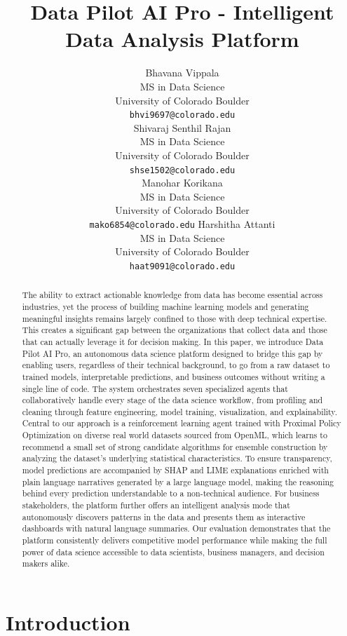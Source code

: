 \documentclass{article}
\title{Data Pilot AI Pro - Intelligent Data Analysis Platform}
\author{%
  Bhavana Vippala \\
  MS in Data Science\\
  University of Colorado Boulder\\
  \texttt{bhvi9697@colorado.edu} \\
  \And
  Shivaraj Senthil Rajan \\
  MS in Data Science\\
  University of Colorado Boulder\\
  \texttt{shse1502@colorado.edu} \\
  \And
  Manohar Korikana \\
  MS in Data Science\\
  University of Colorado Boulder\\
  \texttt{mako6854@colorado.edu}
  \And
  Harshitha Attanti \\
  MS in Data Science\\
  University of Colorado Boulder\\
  \texttt{haat9091@colorado.edu}
}
\begin{document}
\maketitle

\thispagestyle{plain}
\pagestyle{plain}

\begin{abstract}
The ability to extract actionable knowledge from data has become essential across industries, yet the process of building machine learning models and generating meaningful insights remains largely confined to those with deep technical expertise. This creates a significant gap between the organizations that collect data and those that can actually leverage it for decision making. In this paper, we introduce Data Pilot AI Pro, an autonomous data science platform designed to bridge this gap by enabling users, regardless of their technical background, to go from a raw dataset to trained models, interpretable predictions, and business outcomes without writing a single line of code. The system orchestrates seven specialized agents that collaboratively handle every stage of the data science workflow, from profiling and cleaning through feature engineering, model training, visualization, and explainability. Central to our approach is a reinforcement learning agent trained with Proximal Policy Optimization on diverse real world datasets sourced from OpenML, which learns to recommend a small set of strong candidate algorithms for ensemble construction by analyzing the dataset's underlying statistical characteristics. To ensure transparency, model predictions are accompanied by SHAP and LIME explanations enriched with plain language narratives generated by a large language model, making the reasoning behind every prediction understandable to a non-technical audience. For business stakeholders, the platform further offers an intelligent analysis mode that autonomously discovers patterns in the data and presents them as interactive dashboards with natural language summaries. Our evaluation demonstrates that the platform consistently delivers competitive model performance while making the full power of data science accessible to data scientists, business managers, and decision makers alike.

\end{abstract}




\section{Introduction}
\end{document}
